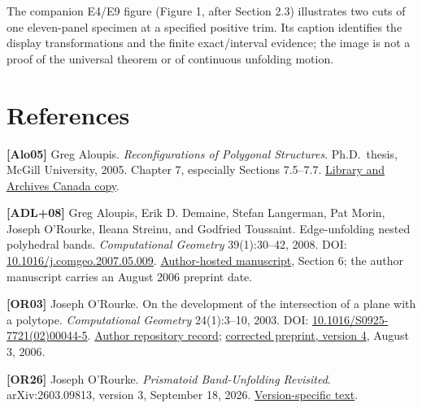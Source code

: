 \documentclass[
  11pt,
  letterpaper,
]{article}
\begin{document}
The companion E4/E9 figure (Figure 1, after Section 2.3) illustrates two
cuts of one eleven-panel specimen at a specified positive trim. Its
caption identifies the display transformations and the finite
exact/interval evidence; the image is not a proof of the universal
theorem or of continuous unfolding motion.

\section{References}\label{references}

\textbf{{[}Alo05{]}} Greg Aloupis. \emph{Reconfigurations of Polygonal
Structures}. Ph.D.~thesis, McGill University, 2005. Chapter 7,
especially Sections 7.5--7.7.
\href{https://central.bac-lac.gc.ca/.item?app=Library&id=TC-QMM-85114&oclc_number=894086208&op=pdf}{Library
and Archives Canada copy}.

\textbf{{[}ADL+08{]}} Greg Aloupis, Erik D. Demaine, Stefan Langerman,
Pat Morin, Joseph O'Rourke, Ileana Streinu, and Godfried Toussaint.
Edge-unfolding nested polyhedral bands. \emph{Computational Geometry}
39(1):30--42, 2008. DOI:
\href{https://doi.org/10.1016/j.comgeo.2007.05.009}{10.1016/j.comgeo.2007.05.009}.
\href{https://erikdemaine.org/papers/BandUnfolding_CGTA/paper.pdf}{Author-hosted
manuscript}, Section 6; the author manuscript carries an August 2006
preprint date.

\textbf{{[}OR03{]}} Joseph O'Rourke. On the development of the
intersection of a plane with a polytope. \emph{Computational Geometry}
24(1):3--10, 2003. DOI:
\href{https://doi.org/10.1016/S0925-7721(02)00044-5}{10.1016/S0925-7721(02)00044-5}.
\href{https://scholarworks.smith.edu/csc_facpubs/69/}{Author repository
record}; \href{https://arxiv.org/abs/cs/0006035v4}{corrected preprint,
version 4}, August 3, 2006.

\textbf{{[}OR26{]}} Joseph O'Rourke. \emph{Prismatoid Band-Unfolding
Revisited}. arXiv:2603.09813, version 3, September 18, 2026.
\href{https://arxiv.org/html/2603.09813v3}{Version-specific text}.
\end{document}
